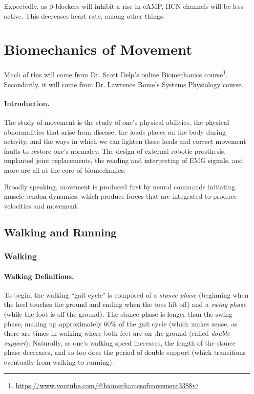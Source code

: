 Expectedly, as $\beta$-blockers will inhibit a rise in cAMP, HCN channels will be less active. This decreases heart rate, among other things. 






\chapter{Biomechanics of Movement}

\label{sec:Biomechanics}

Much of this will come from Dr. Scott Delp's online Biomechanics course\footnote{\url{https://www.youtube.com/@biomechanicsofmovement3388}}. Secondarily, it will come from Dr. Lawrence Rome's Systems Physiology course. 


\subsubsection{Introduction.}

The study of movement is the study of one's physical abilities, the physical abnormalities that arise from disease, the loads places on the body during activity, and the ways in which we can lighten these loads and correct movement faults to restore one's normalcy. The design of external robotic prosthesis, implanted joint replacements, the reading and interpreting of EMG signals, and more are all at the core of biomechanics.\newline

Broadly speaking, movement is produced first by neural commands initiating muscle-tendon dynamics, which produce forces that are integrated to produce velocities and movement. 

\section{Walking and Running}

\subsection{Walking}

\subsubsection{Walking Definitions.}

To begin, the walking ``gait cycle" is composed of a \textit{stance phase} (beginning when the heel touches the ground and ending when the toes lift off) and a \textit{swing phase} (while the foot is off the ground). The stance phase is longer than the swing phase, making up approximately $60\%$ of the gait cycle (which makes sense, as there are times in walking where both feet are on the ground (called \textit{double support}). Naturally, as one's walking speed increases, the length of the stance phase decreases, and so too does the period of double support (which transitions eventually from walking to running).\newline

